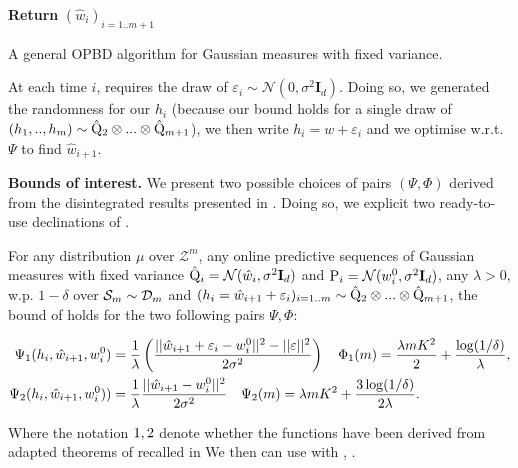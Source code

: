 \begin{algorithm}[ht]
 \SetAlgoLined
\textbf{Return} $(\hat{w}_i)_{i=1..m+1}$
 \caption{A general OPBD algorithm for Gaussian measures with fixed variance.}
 \label{alg: OPBD_alg}
 \end{algorithm}

At each time $i$,  requires the draw of $\varepsilon_i\sim\mathcal{N}(0,\sigma^2 \mathbf{I}_d)$. Doing so, we generated the randomness for our $h_i$ (because our bound holds for a single draw of $(h_1,..,h_m)\sim \hat{\Q}_2\otimes...\otimes \hat{\Q}_{m+1}$), we then write $h_i= w + \varepsilon_i$
and we optimise w.r.t. $\Psi$ to find $\hat{w}_{i+1}$.

\textbf{Bounds of interest.} We present two possible choices of pairs $(\Psi,\Phi)$ derived from the disintegrated results presented in . Doing so, we explicit two ready-to-use declinations of .

\begin{corollary}
  \label{cor: OPBD_optim_funcs}
  For any distribution $\mu$ over $\mathcal{Z}^m$, any online predictive sequences of Gaussian measures with fixed variance $\hat{\Q}_i= \mathcal{N}(\hat{w}_i, \sigma^2\mathbf{I}_d)$ and $\P_{i}= \mathcal{N}(w_i^0,\sigma^2\mathbf{I}_d)$, any $\lambda>0$, w.p. $1-\delta$ over $\Sm\sim\Dm$ and $(h_i=\hat{w}_{i+1} + \varepsilon_i)_{i=1..m}\sim \hat{\Q}_2\otimes...\otimes \hat{\Q}_{m+1}$,
  the bound of  holds for the two following pairs $\Psi,\Phi$:

\begin{align}
  \label{eq: rivasplata_OPBD}
     \Psi_{\normalfont1}(h_i,\hat{w}_{i+1}, w_i^0) & = \frac{1}{\lambda}\left( \frac{||\hat{w}_{i+1} + \varepsilon_i- w_i^0||^2 - ||\varepsilon||^2}{2\sigma^2} \right) \quad \Phi_{\normalfont1}(m) = \frac{\lambda m K^2}{2} + \frac{\log(1/\delta)}{\lambda},\\
    \label{eq: viallard_OPBD}
    \Psi_{\normalfont2}(h_i, \hat{w}_{i+1}, w_i^0)) &  = \frac{1}{\lambda}\frac{||\hat{w}_{i+1}-w_i^0||^2}{2\sigma^2} \quad \Psi_{\normalfont2}(m) = \lambda m K^2 + \frac{3\log(1/\delta)}{2\lambda}.
  \end{align}

  Where the notation $\normalfont1, \normalfont2$ denote whether the functions have been derived from adapted theorems of \citealp{rivasplata2020pac,viallard2023general} recalled in 
  We then can use  with  , .

\end{corollary}

